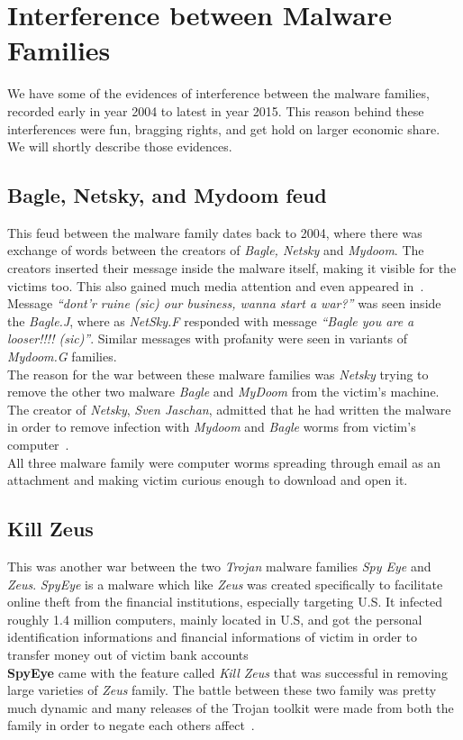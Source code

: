\section{Interference between Malware Families}
\label{sec:Interference between Malware Families}
We have some of the evidences of interference between the malware families, recorded early in year 2004 to latest in year 2015.
This reason behind these interferences were fun, bragging rights, and get hold on larger economic share.
We will shortly describe those evidences.
\subsection{Bagle, Netsky, and Mydoom feud}
\label{sub:Bagle, Netsky, and Mydoom feud}
This feud between the malware family dates back to 2004, where there was exchange of words between the creators of \emph{Bagle, Netsky} and \emph{Mydoom}.
The creators inserted their message inside the malware itself, making it visible for the victims too. This also gained much media attention and even appeared in~\cite[BBC]{bbccover}.
Message \emph{``dont'r ruine (sic) our business, wanna start a war?''} was seen inside the \emph{Bagle.J}, where as \emph{NetSky.F} responded with message \emph{``Bagle \- you are a looser!!!! (sic)''}.
Similar messages with profanity were seen in variants of \emph{Mydoom.G} families.\\
The reason for the war between these malware families was \emph{Netsky} trying to remove the other two malware \emph{Bagle} and \emph{MyDoom} from the victim's machine.
The creator of \emph{Netsky}, \emph{Sven Jaschan}, admitted that he had written the malware in order to remove infection with \emph{Mydoom} and \emph{Bagle} worms from victim's computer~\cite[]{wikinetsky}.\\
All three malware family were computer worms spreading through email as an attachment and making victim curious enough to download and open it.
\subsection{Kill Zeus}
\label{sub:Kill Zeus}
This was another war between the two \emph{Trojan} malware families \emph{Spy Eye} and \emph{Zeus}.
\emph{SpyEye} is a malware which like \emph{Zeus} was created specifically to facilitate online theft from the financial institutions, especially targeting U.S.
It infected roughly 1.4 million computers, mainly located in U.S, and got the personal identification informations and financial informations of victim in order to transfer money out of victim bank accounts~\cite[]{fbispyeye} \\
\textbf{SpyEye} came with the feature called \emph{Kill Zeus} that was successful in removing large varieties of \emph{Zeus} family.
The battle between these two family was pretty much dynamic and many releases of the Trojan toolkit were made from both the family in order to negate each others affect~\cite[]{sanszeus}.
